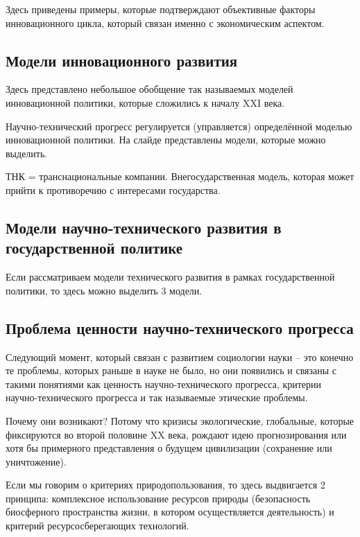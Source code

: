 \documentclass[main.tex]{subfiles}
\begin{document}

Здесь приведены примеры, которые подтверждают объективные факторы инновационного цикла, который связан именно с экономическим аспектом.

\subsection{Модели инновационного развития}


Здесь представлено небольшое обобщение так называемых моделей инновационной политики, которые сложились к началу XXI века.

Научно-технический прогресс регулируется (управляется) определённой моделью инновационной политики.
На слайде представлены модели, которые можно выделить.

ТНК = транснациональные компании.
Внегосударственная модель, которая может прийти к противоречию с интересами государства.

\subsection{Модели научно-технического развития в государственной политике}


Если рассматриваем модели технического развития в рамках государственной политики, то здесь можно выделить 3 модели.

\subsection{Проблема ценности научно-технического прогресса}


Следующий момент, который связан с развитием социологии науки -- это конечно те проблемы, которых раньше в науке не было, но они появились и связаны с такими понятиями как ценность научно-технического прогресса, критерии научно-технического прогресса и так называемые этические проблемы.

Почему они возникают?
Потому что кризисы экологические, глобальные, которые фиксируются во второй половине XX века, рождают идею прогнозирования или хотя бы примерного представления о будущем цивилизации (сохранение или уничтожение).

Если мы говорим о критериях природопользования, то здесь выдвигается 2 принципа: комплексное использование ресурсов природы (безопасность биосферного пространства жизни, в котором осуществляется деятельность) и критерий ресурсосберегающих технологий.
\end{document}
